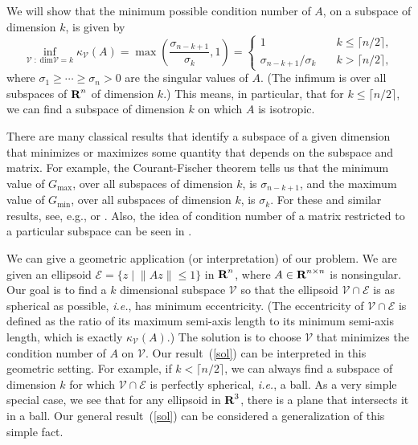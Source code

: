 \documentclass[12pt]{article}
\newcommand{\ie}{{\it i.e.}}%
\newcommand{\reals}{{\mbox{\bf R}}}%
\begin{document}
We will show that the minimum possible condition number of $A$,
on a subspace of dimension $k$, is given by
\begin{equation}
\label{sol}
\inf_{\mathcal V\;:\;\mathrm{dim} \mathcal V=k}
\kappa_{\mathcal V} (A) =
\max \left(\frac{\sigma_{n-k+1}}{\sigma_k}, 1 \right)  =
\left\{ \begin{array}{ll} 
1 & \quad  k \leq \lceil n/2 \rceil,\\
\sigma_{n-k+1} / \sigma_k & \quad  k > \lceil n/2 \rceil,
\end{array}\right.
\end{equation}
where $\sigma_1 \geq \cdots \geq \sigma_n >0$
are the singular values of $A$.  (The infimum is over all
subspaces of $\reals^n$ of dimension $k$.)
This means, in particular, that for $k \leq \lceil n/2 \rceil$,
we can find a subspace of dimension $k$ on which $A$ is isotropic.

There are many classical results that identify a subspace of a
given dimension that minimizes or maximizes some quantity that
depends on the subspace and matrix.
For example, the Courant-Fischer theorem tells us that the
minimum value of $G_\mathrm{max}$, over all subspaces of
dimension $k$, is $\sigma_{n-k+1}$, and the
maximum value of $G_\mathrm{min}$, over all subspaces of
dimension $k$, is $\sigma_{k}$. For these and similar results,
see, e.g., \cite[\S 4.2]{HoJ:85} or \cite{Ber:05}.
Also, the idea of condition number of a matrix restricted to a
particular subspace can be seen in \cite{ChanF:88}.

We can give a geometric application (or interpretation) of 
our problem.
We are given an ellipsoid $\mathcal E = \{ z \;|\; \|Az \|\leq 1\}$
in $\reals^n$, where $A \in \reals^{n \times n}$ is nonsingular.
Our goal is to find a $k$ dimensional subspace $\mathcal V$
so that the ellipsoid $\mathcal V \cap \mathcal E$ is as spherical
as possible, \ie, has minimum eccentricity.
(The eccentricity of $\mathcal V \cap \mathcal E$ is defined as
the ratio of its maximum semi-axis length to its 
minimum semi-axis length, which is exactly $\kappa_{\mathcal V}(A)$.)
The solution is to choose $\mathcal V$ that minimizes the condition
number of $A$ on $\mathcal V$.
Our result~(\ref{sol}) can be interpreted in this geometric setting.
For example, if $k< \lceil n/2 \rceil$, we can always find a subspace
of dimension $k$ for which $\mathcal V \cap \mathcal E$ is perfectly 
spherical, \ie, a ball.
As a very simple special case, we see that for any ellipsoid in 
$\reals^3$, there is a plane that intersects it in a ball.
Our general result~(\ref{sol}) can be considered a generalization of
this simple fact.
\end{document}
